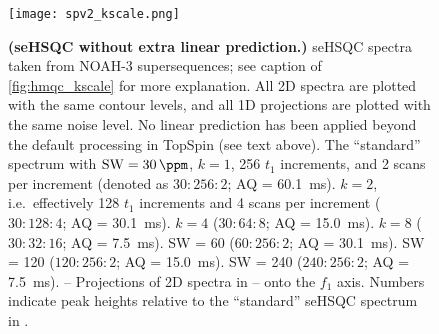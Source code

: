\begin{figure}
    \centering
    \texttt{[image: spv2\_kscale.png]}
    {\label{fig:spv2_kscale_std}}
    {\label{fig:spv2_kscale_k2}}
    {\label{fig:spv2_kscale_k4}}
    {\label{fig:spv2_kscale_k8}}
    {\label{fig:spv2_kscale_sw2}}
    {\label{fig:spv2_kscale_sw4}}
    {\label{fig:spv2_kscale_sw8}}
    {\label{fig:spv2_kscale_std_proj}}
    {\label{fig:spv2_kscale_k2_proj}}
    {\label{fig:spv2_kscale_k4_proj}}
    {\label{fig:spv2_kscale_k8_proj}}
    {\label{fig:spv2_kscale_sw2_proj}}
    {\label{fig:spv2_kscale_sw4_proj}}
    {\label{fig:spv2_kscale_sw8_proj}}
    \caption{
        \textbf{(seHSQC without extra linear prediction.)}
        \nitrogen{} seHSQC spectra taken from NOAH-3  supersequences; see caption of \cref{fig:hmqc_kscale} for more explanation.
        All 2D spectra are plotted with the same contour levels, and all 1D projections are plotted with the same noise level.
        No linear prediction has been applied beyond the default processing in TopSpin (see text above).
        \textbf{} The ``standard'' spectrum with $\mathrm{SW} = \SI{30}{\ppm}$, $k = 1$, 256 $t_1$ increments, and 2 scans per increment (denoted as $30:256:2$; AQ = \SI{60.1}{\ms}).
        \textbf{} $k = 2$, i.e.\ effectively 128 $t_1$ increments and 4 scans per increment ($30:128:4$; AQ = \SI{30.1}{\ms}).
        \textbf{} $k = 4$ ($30:64:8$; AQ = \SI{15.0}{\ms}).
        \textbf{} $k = 8$ ($30:32:16$; AQ = \SI{7.5}{\ms}).
        \textbf{} SW = \SI{60}{\ppm} ($60:256:2$; AQ = \SI{30.1}{\ms}).
        \textbf{} SW = \SI{120}{\ppm} ($120:256:2$; AQ = \SI{15.0}{\ms}).
        \textbf{} SW = \SI{240}{\ppm} ($240:256:2$; AQ = \SI{7.5}{\ms}).
        \textbf{}--\textbf{} Projections of 2D spectra in -- onto the $f_1$ axis.
        Numbers indicate peak heights relative to the ``standard'' seHSQC spectrum in .
        \grami{}
    }
    \label{fig:spv2_kscale}
\end{figure}

